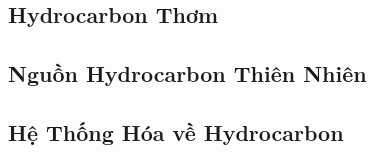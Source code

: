 \documentclass{article}
\numberwithin{equation}{section}
\begin{document}
\subsection{Hydrocarbon Thơm}


\subsection{Nguồn Hydrocarbon Thiên Nhiên}


\subsection{Hệ Thống Hóa về Hydrocarbon}


\printbibliography[heading=bibintoc]
	
\end{document}
